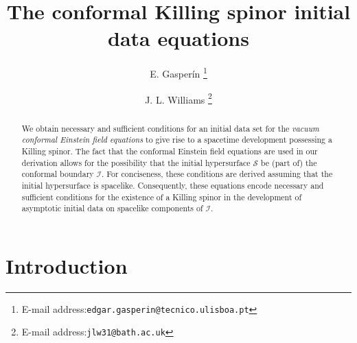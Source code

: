 \documentclass[10pt,a4paper]{article}
\theoremstyle{plain}
\begin{document}
\title{\textbf{The conformal Killing spinor initial data equations}}


\author[1]{E. Gasper\'in \footnote{E-mail address:{\tt edgar.gasperin@tecnico.ulisboa.pt}}}
\author[2]{J. L. Williams \footnote{E-mail address:{\tt jlw31@bath.ac.uk}}}



\maketitle
\begin{abstract}
  We obtain necessary and sufficient conditions for an initial data
  set for the \emph{vacuum conformal Einstein field equations} to give
  rise to a spacetime development possessing a Killing spinor.  The
  fact that the conformal Einstein field equations are used in our
  derivation allows for the possibility that the initial hypersurface
  $\mathcal{S}$ be (part of) the conformal boundary $\mathscr{I}$.
  For conciseness, these conditions are derived assuming that the
  initial hypersurface is spacelike. Consequently, these equations
  encode necessary and sufficient conditions for the existence of a
  Killing spinor in the development of asymptotic initial data on
  spacelike components of $\mathscr{I}$.
\end{abstract}


\section{Introduction}
\label{sec:Introduction}
\end{document}
